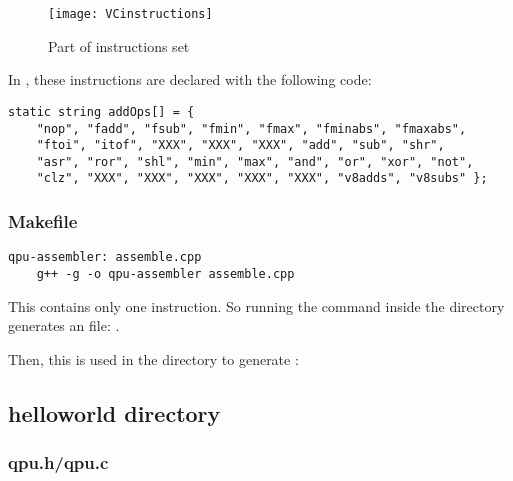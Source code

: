 \begin{figure}[!htbp]
	\centering
	\texttt{[image: VCinstructions]}
	\caption{Part of \vc{} instructions set}
	\label{VCinstructionsFigure}
\end{figure}
\FloatBarrier
\vspace{5mm}


In , these instructions are declared with the following  code:

\begin{lstlisting}
static string addOps[] = {
    "nop", "fadd", "fsub", "fmin", "fmax", "fminabs", "fmaxabs",
    "ftoi", "itof", "XXX", "XXX", "XXX", "add", "sub", "shr",
    "asr", "ror", "shl", "min", "max", "and", "or", "xor", "not",
    "clz", "XXX", "XXX", "XXX", "XXX", "XXX", "v8adds", "v8subs" };
\end{lstlisting}


\subsubsection{Makefile}

\begin{lstlisting}
qpu-assembler: assemble.cpp
	g++ -g -o qpu-assembler assemble.cpp
\end{lstlisting}

This  contains only one instruction. So running the  command inside the  directory generates an  file: .
\vspace{10mm}

Then, this  is used in the  directory to generate :
\begin{center}
\end{center}
\newpage

\subsection{helloworld directory}

\subsubsection{qpu.h/qpu.c}

